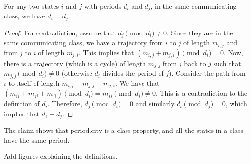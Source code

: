 \begin{itemize}
\begin{claim}
For any two states $i$ and $j$ with periods $d_i$ and $d_j$, in the
same communicating class, we have $d_i=d_j$.
\end{claim}
\begin{proof}
For contradiction, assume that $d_j \pmod {d_i}\neq 0$. Since they
are in the same communicating class, we have a trajectory from $i$
to $j$ of length $m_{i,j}$ and from $j$ to $i$ of length $m_{j,i}$.
This implies that $(m_{i,j}+m_{j,i})\pmod {d_i}=0$. Now, there is a
trajectory (which is a cycle) of length $m_{j,j}$ from $j$ back to
$j$ such that $m_{j,j}\pmod {d_i}\neq 0$ (otherwise $d_i$ divides
the period of $j$). Consider the path from $i$ to itself of length
$m_{i,j}+m_{j,j}+m_{j,i}$. We have that $(m_{ij}+m_{jj}+m_{ji})\pmod
{d_i} = m_{jj}\pmod {d_i} \neq 0$. This is a contradiction to the
definition of $d_i$. Therefore, $d_j \pmod {d_i}=0$ and similarly
$d_i \pmod {d_j}=0$, which implies that $d_i=d_j$.
\end{proof}
The claim shows that periodicity is a class property, and all the
states in a class have the same period.
\end{itemize}

\begin{example}
Add figures explaining the definitions.
\end{example}

